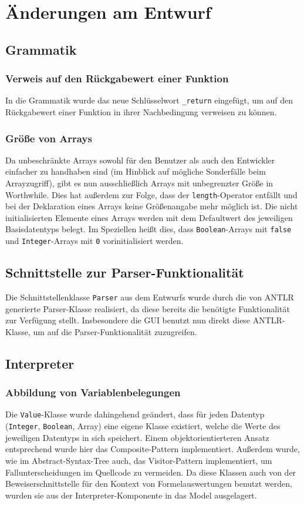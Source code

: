 \section{Änderungen am Entwurf}
\subsection{Grammatik}
\subsubsection{Verweis auf den Rückgabewert einer Funktion}
In die Grammatik wurde das neue Schlüsselwort \texttt{\_return} eingefügt, um auf den Rückgabewert einer Funktion in ihrer Nachbedingung verweisen zu können.

\subsubsection{Größe von Arrays}
Da unbeschränkte Arrays sowohl für den Benutzer als auch den Entwickler einfacher zu handhaben sind (im Hinblick auf mögliche Sonderfälle beim Arrayzugriff), gibt es nun ausschließlich Arrays mit unbegrenzter Größe in Worthwhile. Dies hat außerdem zur Folge, dass der \texttt{length}-Operator entfällt und bei der Deklaration eines Arrays keine Größenangabe mehr möglich ist. Die nicht initialisierten Elemente eines Arrays werden mit dem Defaultwert des jeweiligen Basisdatentyps belegt. Im Speziellen heißt dies, dass \texttt{Boolean}-Arrays mit \texttt{false} und \texttt{Integer}-Arrays mit \texttt{0} vorinitialisiert werden.

\subsection{Schnittstelle zur Parser-Funktionalität\label{aenderung_parser}}
Die Schnittstellenklasse \texttt{Parser} aus dem Entwurfs wurde durch die von ANTLR generierte Parser-Klasse realisiert, da diese bereits die benötigte Funktionalität zur Verfügung stellt. Insbesondere die GUI benutzt nun direkt diese ANTLR-Klasse, um auf die Parser-Funktionalität zuzugreifen.

\subsection{Interpreter}
\subsubsection{Abbildung von Variablenbelegungen}
Die \texttt{Value}-Klasse wurde dahingehend geändert, dass für jeden Datentyp (\texttt{Integer}, \texttt{Boolean}, Array) eine eigene Klasse existiert, welche die Werte des jeweiligen Datentyps in sich speichert. Einem objektorientierteren Ansatz entsprechend wurde hier das Composite-Pattern implementiert. Außerdem wurde, wie im Abstract-Syntax-Tree auch, das Visitor-Pattern implementiert, um Fallunterscheidungen im Quellcode zu vermeiden. Da diese Klassen auch von der Beweiserschnittstelle für den Kontext von Formelauswertungen benutzt werden, wurden sie aus der Interpreter-Komponente in das Model ausgelagert.

